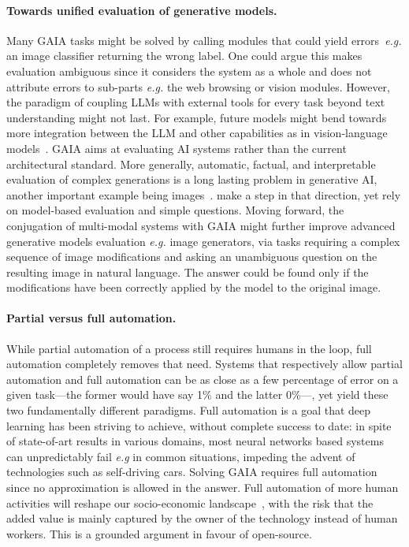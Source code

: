 \documentclass{fairmeta}
\newcommand{\benchmark}{\textsc{GAIA}}
\begin{document}
\vspace{-.2cm}


\paragraph{Towards unified evaluation of generative models.} Many \benchmark{} tasks might be solved by calling modules that could yield errors~\textit{e.g.} an image classifier returning the wrong label. One could argue this makes evaluation ambiguous since it considers the system as a whole and does not attribute errors to sub-parts \textit{e.g.} the web browsing or vision modules. 
However, the paradigm of coupling LLMs with external tools for every task beyond text understanding might not last. 
For example, future models might bend towards more integration between the LLM and other capabilities as in vision-language models~\citep{alayrac2022flamingo,laurençon2023obelics}. \benchmark{} aims at evaluating AI systems rather than the current architectural standard.
More generally, automatic, factual, and interpretable evaluation of complex generations is a long lasting problem in generative AI, another important example being images~\citep{stein2023exposing}. \citet{hu2023tifa} make a step in that direction, yet rely on model-based evaluation and simple questions. Moving forward, the conjugation of multi-modal systems with \benchmark{} might further improve advanced generative models evaluation \textit{e.g.} image generators, via tasks requiring a complex sequence of image modifications and asking an unambiguous question on the resulting image in natural language. The answer could be found only if the modifications have been correctly applied by the model to the original image.

\vspace{-.2cm}

\paragraph{Partial versus full automation.} While partial automation of a process still requires humans in the loop, full automation completely removes that need. Systems that respectively allow partial automation and full automation can be as close as a few percentage of error on a given task---the former would have say 1\% and the latter 0\%---, yet yield these two fundamentally different paradigms. Full automation is a goal that deep learning has been striving to achieve, without complete success to date: in spite of state-of-art results in various domains, most neural networks based systems can unpredictably fail \textit{e.g} in common situations, impeding the advent of technologies such as self-driving cars. 
Solving \benchmark{} requires full automation since no approximation is allowed in the answer. Full automation of more human activities will reshape our socio-economic landscape~\citep{growiec_2022}, with the risk that the added value is mainly captured by the owner of the technology instead of human workers. This is a grounded argument in favour of open-source.
\end{document}
